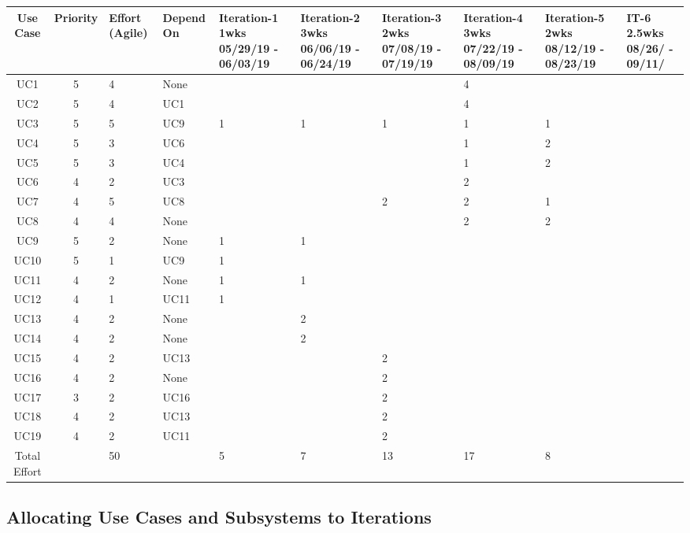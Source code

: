 \documentclass[11pt]{article}
\begin{document}
\begin{center}
	\hspace*{-1.8cm}\begin{tabular}{|c|c|p{2.4cm}|p{1.2cm}|p{1.8cm}|p{1.8cm}|p{1.8cm}|p{1.8cm}|p{1.8cm}|p{1cm}|}
	\hline
	Use Case & Priority & Effort (Agile) & Depend On & Iteration-1  1wks 05/29/19 - 06/03/19 & Iteration-2 3wks 06/06/19 - 06/24/19 & Iteration-3 2wks 07/08/19 - 07/19/19 & Iteration-4 3wks 07/22/19 - 08/09/19 & Iteration-5 2wks  08/12/19 - 08/23/19 & IT-6 2.5wks 08/26/ - 09/11/\\
	\hline
	UC1 & 5 & 4 & None & & & & 4 & & \\
	\hline
	UC2 & 5 & 4 & UC1 & & & & 4 & & \\
	\hline
	UC3 & 5 & 5 & UC9 & 1 & 1 & 1 & 1 & 1 & \\
	\hline
	UC4 & 5 & 3 & UC6 & & & & 1 & 2 & \\
	\hline
	UC5 & 5 & 3 & UC4 & & & & 1 & 2 & \\
	\hline
	UC6 & 4 & 2 & UC3 & & & & 2 & & \\
	\hline
	UC7 & 4 & 5 & UC8 & & & 2 & 2 & 1 & \\
	\hline
	UC8 & 4 & 4 & None & & & & 2 & 2 & \\
	\hline
	UC9 & 5 & 2 & None & 1 & 1 & & & & \\
	\hline
	UC10 & 5 & 1 & UC9 & 1 & & & & & \\
	\hline
	UC11 & 4 & 2 & None & 1 & 1 & & & & \\
	\hline
	UC12 & 4 & 1 & UC11 & 1 & & & & & \\
	\hline
	UC13 & 4 & 2 & None & & 2 & & & & \\
	\hline
	UC14 & 4 & 2 & None & & 2& & & & \\
	\hline
	UC15 & 4 & 2 & UC13 & & & 2 &  &  & \\
	\hline
	UC16 & 4 & 2 & None & & & 2 &  & & \\
	\hline
	UC17 & 3 & 2 & UC16 & & & 2  & & & \\
	\hline
	UC18 & 4 & 2 & UC13 & & & 2 & & & \\
	\hline
	UC19 & 4 & 2 & UC11 & & & 2 & & & \\
	\hline
	Total Effort &  & 50 & & 5 & 7 & 13 & 17 & 8 & \\
	\hline
	\end{tabular}
\end{center}

\subsection{Allocating Use Cases and Subsystems to Iterations}
\end{document}
